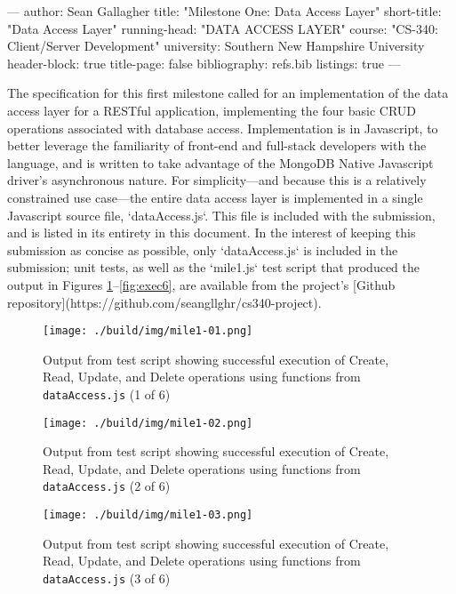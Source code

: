 ---
author: Sean Gallagher
title: "Milestone One: Data Access Layer"
short-title: "Data Access Layer"
running-head: "DATA ACCESS LAYER"
course: "CS-340: Client/Server Development"
university: Southern New Hampshire University
header-block: true
title-page: false
bibliography: refs.bib
listings: true
---

The specification for this first milestone called for an implementation of the
data access layer for a RESTful application, implementing the four basic CRUD
operations associated with database access. Implementation is in Javascript, to
better leverage the familiarity of front-end and full-stack developers with the
language, and is written to take advantage of the MongoDB Native Javascript
driver's asynchronous nature. For simplicity---and because this is a relatively
constrained use case---the entire data access layer is implemented in a single
Javascript source file, `dataAccess.js`. This file is included with the
submission, and is listed in its entirety in this document. In the interest of
keeping this submission as concise as possible, only `dataAccess.js` is included
in the submission; unit tests, as well as the `mile1.js` test script that
produced the output in Figures \ref{fig:exec1}--\ref{fig:exec6}, are available
from the project's [Github
repository](https://github.com/seangllghr/cs340-project).



\begin{figure}[htbp]
  \texttt{[image: ./build/img/mile1-01.png]}
  \caption{Output from test script showing successful execution of Create, Read,
    Update, and Delete operations using functions from \texttt{dataAccess.js} (1
    of 6)}
  \label{fig:exec1}
\end{figure}

\begin{figure}[htbp]
  \texttt{[image: ./build/img/mile1-02.png]}
  \caption{Output from test script showing successful execution of Create, Read,
    Update, and Delete operations using functions from \texttt{dataAccess.js} (2
    of 6)}
  \label{fig:exec2}
\end{figure}

\begin{figure}[htbp]
  \texttt{[image: ./build/img/mile1-03.png]}
  \caption{Output from test script showing successful execution of Create, Read,
    Update, and Delete operations using functions from \texttt{dataAccess.js} (3
    of 6)}
  \label{fig:exec3}
\end{figure}

